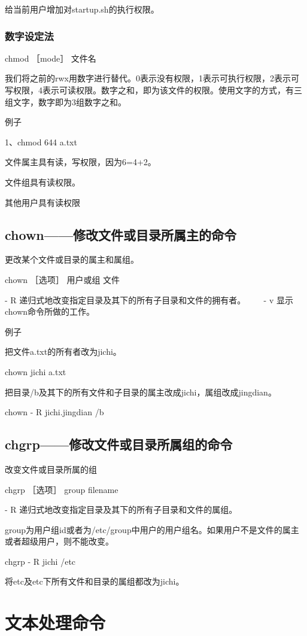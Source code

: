 给当前用户增加对startup.sh的执行权限。


\subsubsection{数字设定法}
chmod ［mode］ 文件名

我们将之前的rwx用数字进行替代。0表示没有权限，1表示可执行权限，2表示可写权限，4表示可读权限。数字之和，即为该文件的权限。使用文字的方式，有三组文字，数字即为3组数字之和。

例子

1、chmod 644 a.txt

文件属主具有读，写权限，因为6=4+2。

文件组具有读权限。

其他用户具有读权限


\subsection{chown——修改文件或目录所属主的命令}
更改某个文件或目录的属主和属组。

chown ［选项］ 用户或组 文件　　

- R 递归式地改变指定目录及其下的所有子目录和文件的拥有者。　
　
- v 显示chown命令所做的工作。　　

例子

把文件a.txt的所有者改为jichi。

chown jichi a.txt　　

把目录/b及其下的所有文件和子目录的属主改成jichi，属组改成jingdian。

chown - R jichi.jingdian /b



\subsection{chgrp——修改文件或目录所属组的命令}
改变文件或目录所属的组

chgrp ［选项］ group filename

- R 递归式地改变指定目录及其下的所有子目录和文件的属组。

group为用户组id或者为/etc/group中用户的用户组名。如果用户不是文件的属主或者超级用户，则不能改变。

chgrp - R jichi /etc

将etc及etc下所有文件和目录的属组都改为jichi。



\section{文本处理命令}
